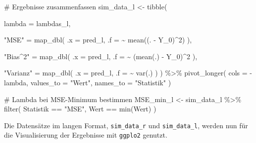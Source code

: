 \documentclass[
  a4paper,
  DIV=11,
  oneside]{scrreprt}
\newenvironment{Shaded}{\begin{snugshade}}{\end{snugshade}}
\newcommand{\AttributeTok}[1]{\textcolor[rgb]{0.40,0.45,0.13}{#1}}
\newcommand{\CommentTok}[1]{\textcolor[rgb]{0.37,0.37,0.37}{#1}}
\newcommand{\DecValTok}[1]{\textcolor[rgb]{0.68,0.00,0.00}{#1}}
\newcommand{\FunctionTok}[1]{\textcolor[rgb]{0.28,0.35,0.67}{#1}}
\newcommand{\NormalTok}[1]{\textcolor[rgb]{0.00,0.23,0.31}{#1}}
\newcommand{\OtherTok}[1]{\textcolor[rgb]{0.00,0.23,0.31}{#1}}
\newcommand{\SpecialCharTok}[1]{\textcolor[rgb]{0.37,0.37,0.37}{#1}}
\newcommand{\StringTok}[1]{\textcolor[rgb]{0.13,0.47,0.30}{#1}}
\begin{document}
\begin{Shaded}
\begin{Highlighting}[]
\CommentTok{\# Ergebnisse zusammenfassen}
\NormalTok{sim\_data\_l }\OtherTok{\textless{}{-}} \FunctionTok{tibble}\NormalTok{(}
  
  \AttributeTok{lambda =}\NormalTok{ lambdas\_l,}
  
  \StringTok{"MSE"} \OtherTok{=} \FunctionTok{map\_dbl}\NormalTok{(}
    \AttributeTok{.x =}\NormalTok{ pred\_l,  }
    \AttributeTok{.f =} \SpecialCharTok{\textasciitilde{}} \FunctionTok{mean}\NormalTok{((. }\SpecialCharTok{{-}}\NormalTok{ Y\_0)}\SpecialCharTok{\^{}}\DecValTok{2}\NormalTok{)}
\NormalTok{  ),}
  
  \StringTok{"Bias\^{}2"} \OtherTok{=} \FunctionTok{map\_dbl}\NormalTok{(}
    \AttributeTok{.x =}\NormalTok{ pred\_l, }
    \AttributeTok{.f =} \SpecialCharTok{\textasciitilde{}}\NormalTok{ (}\FunctionTok{mean}\NormalTok{(.) }\SpecialCharTok{{-}}\NormalTok{ Y\_0)}\SpecialCharTok{\^{}}\DecValTok{2}
\NormalTok{  ),}
  
  \StringTok{"Varianz"} \OtherTok{=} \FunctionTok{map\_dbl}\NormalTok{(}
    \AttributeTok{.x =}\NormalTok{ pred\_l, }
    \AttributeTok{.f =} \SpecialCharTok{\textasciitilde{}} \FunctionTok{var}\NormalTok{(.)}
\NormalTok{  )}
\NormalTok{) }\SpecialCharTok{\%\textgreater{}\%}
  \FunctionTok{pivot\_longer}\NormalTok{(}
    \AttributeTok{cols =} \SpecialCharTok{{-}}\NormalTok{lambda, }
    \AttributeTok{values\_to =} \StringTok{"Wert"}\NormalTok{, }
    \AttributeTok{names\_to =} \StringTok{"Statistik"}
\NormalTok{  )}

\CommentTok{\# Lambda bei MSE{-}Minimum bestimmen}
\NormalTok{MSE\_min\_l }\OtherTok{\textless{}{-}}\NormalTok{ sim\_data\_l }\SpecialCharTok{\%\textgreater{}\%} 
  \FunctionTok{filter}\NormalTok{(}
\NormalTok{    Statistik }\SpecialCharTok{==} \StringTok{"MSE"}\NormalTok{,}
\NormalTok{    Wert }\SpecialCharTok{==} \FunctionTok{min}\NormalTok{(Wert)}
\NormalTok{  ) }
\end{Highlighting}
\end{Shaded}

Die Datensätze im langen Format, \texttt{sim\_data\_r} und
\texttt{sim\_data\_l}, werden nun für die Visualisierung der Ergebnisse
mit \texttt{ggplo2} genutzt.
\end{document}
